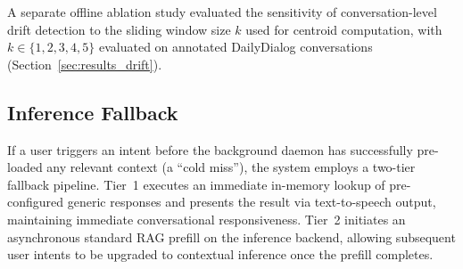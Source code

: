 A separate offline ablation study evaluated the sensitivity of conversation-level drift detection to the sliding window size $k$ used for centroid computation, with $k \in \{1, 2, 3, 4, 5\}$ evaluated on annotated DailyDialog conversations (Section~\ref{sec:results_drift}).

\subsection{Inference Fallback}
\label{sec:fallback}

If a user triggers an intent before the background daemon has successfully pre-loaded any relevant context (a ``cold miss''), the system employs a two-tier fallback pipeline. Tier~1 executes an immediate in-memory lookup of pre-configured generic responses and presents the result via text-to-speech output, maintaining immediate conversational responsiveness. Tier~2 initiates an asynchronous standard RAG prefill on the inference backend, allowing subsequent user intents to be upgraded to contextual inference once the prefill completes.
